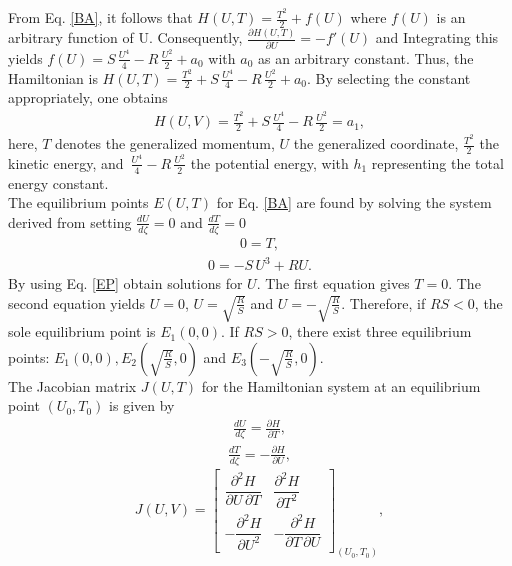 \documentclass[10pt]{NSP1}
\numberwithin{equation}{section}
\begin{document}
From Eq. \ref{BA}, it follows that $H(U, T)=\frac{T^2}{2}+f(U)$ where $f(U)$ is an arbitrary function of U. Consequently, $\frac{\partial H(U,T)}{\partial U} =-f'(U)$ and Integrating this yields $f(U)=S\,\frac{U^4}{4}-R\,\frac{U^2}{2}+a_{0}$ with $a_{0}$ as an arbitrary constant. Thus, the Hamiltonian is $H(U, T) = \frac{T^2}{2}+S\,\frac{U^4}{4}-R\,\frac{U^2}{2}+a_{0}$. By selecting the constant appropriately, one obtains\\
\begin{eqnarray}
H(U, V) = \frac{T^2}{2}+S\,\frac{U^4}{4}-R\,\frac{U^2}{2}=a_{1},
\end{eqnarray}
here, $T$ denotes the generalized momentum, $U$ the generalized coordinate, $\frac{T^2}{2}$ the kinetic energy, and $\,\frac{U^4}{4}-R\,\frac{U^2}{2}$ the potential energy, with $h_{1}$ representing the total energy constant.\\
The equilibrium points $E(U, T)$ for Eq. \ref{BA} are found by solving the system derived from setting $\frac{d U}{d \zeta}= 0$ and $\frac{d T}{d \zeta} = 0$
\begin{eqnarray}\label{EP}
0 = T,\nonumber
\end{eqnarray}
\begin{eqnarray}
0 = -S \,U^{3}+R U.
\end{eqnarray}
By using Eq. \ref{EP} obtain solutions for $U$. The first equation gives $T = 0$. The second equation yields $U=0$, $U=\sqrt{\frac{R}{S}}$ and $U=-\sqrt{\frac{R}{S}}$. Therefore, if $RS < 0$, the sole equilibrium point is $E_{1}(0, 0)$. If $RS > 0$, there exist three equilibrium points: $E_{1}(0, 0), E_{2}(\sqrt{\frac{R}{S}},0)$ and $E_{3}(-\sqrt{\frac{R}{S}}, 0)$.\\
The Jacobian matrix $J(U, T)$ for the Hamiltonian system at an equilibrium point $(U_{0},T_{0})$ is given by
\begin{eqnarray}
\frac{d U}{d \zeta} = \frac{\partial H}{\partial T},
\end{eqnarray}
\begin{eqnarray}
\frac{d T}{d \zeta} = -\frac{\partial H}{\partial U},
\end{eqnarray}
\begin{equation}
J(U, V) =
\begin{bmatrix}
\dfrac{\partial^2 H}{\partial U \, \partial T} & \dfrac{\partial^2 H}{\partial T^2} \\[8pt]
-\dfrac{\partial^2 H}{\partial U^2} & -\dfrac{\partial^2 H}{\partial T \, \partial U}
\end{bmatrix}_{(U_0, T_0)},
\end{equation}
\end{document}
